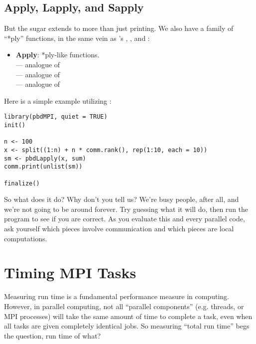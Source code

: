 \subsection{Apply, Lapply, and Sapply}\label{sec:pbdsugar2}

But the  sugar extends to more than just printing.  We also have a family of ``*ply'' functions, in the same vein as 's , , and :
\begin{itemize}
  \item \textbf{Apply}: *ply-like functions.\\
   --- analogue of \\
   --- analogue of \\
   --- analogue of \\
\end{itemize}

Here is a simple example utilizing :
    
\begin{lstlisting}[language=rr,title=Example 4]
library(pbdMPI, quiet = TRUE)
init()

n <- 100
x <- split((1:n) + n * comm.rank(), rep(1:10, each = 10))
sm <- pbdLapply(x, sum)
comm.print(unlist(sm))

finalize()
\end{lstlisting}

So what does it do?  Why don't you tell us?  We're busy people, after all, and we're not going to be around forever.  Try guessing what it will do, then run the program to see if you are correct.  As you evaluate this and every parallel code, ask yourself which pieces involve communication and which pieces are local computations.





\section{Timing MPI Tasks}

Measuring run time is a fundamental performance measure in computing.  However, in parallel computing, not all ``parallel components'' (e.g. threads, or MPI processes) will take the same amount of time to complete a task, even when all tasks are given completely identical jobs.  So measuring ``total run time'' begs the question, run time of what?


